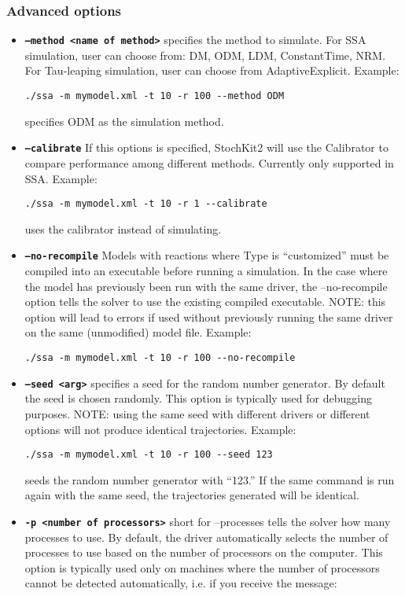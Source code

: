 \documentclass[11pt,letterpaper]{article}
\begin{document}
\subsubsection{Advanced options}
\begin{itemize}
    \item \texttt{\textbf{--method <name of method>}} specifies the method to simulate. For SSA simulation, user can choose from: DM, ODM, LDM, ConstantTime, NRM. For Tau-leaping simulation, user can choose from AdaptiveExplicit.
Example: 
\begin{lstlisting}
./ssa -m mymodel.xml -t 10 -r 100 --method ODM
\end{lstlisting}
specifies ODM as the simulation method.
\item \texttt{\textbf{--calibrate}} If this options is specified, StochKit2 will use the Calibrator to compare performance among different methods. Currently only supported in SSA.
Example: 
\begin{lstlisting}
./ssa -m mymodel.xml -t 10 -r 1 --calibrate
\end{lstlisting}
uses the calibrator instead of simulating.
\item \texttt{\textbf{--no-recompile}} Models with reactions where Type is ``customized'' must be compiled into an executable before running a simulation.  In the case where the model has previously been run with the same driver, the --no-recompile option tells the solver to use the existing compiled executable.  NOTE: this option will lead to errors if used without previously running the same driver on the same (unmodified) model file.
Example: 
\begin{lstlisting}
./ssa -m mymodel.xml -t 10 -r 100 --no-recompile
\end{lstlisting}
\item \texttt{\textbf{--seed <arg>}} specifies a seed for the random number generator.  By default the seed is chosen randomly.  This option is typically used for debugging purposes.  NOTE: using the same seed with different drivers or different options will not produce identical trajectories.
Example: 
\begin{lstlisting}
./ssa -m mymodel.xml -t 10 -r 100 --seed 123
\end{lstlisting}
seeds the random number generator with ``123.''  If the same command is run again with the same seed, the trajectories generated will be identical.
\item \texttt{\textbf{-p <number of processors>}} short for --processes tells the solver how many processes to use.  By default, the driver automatically selects the number of processes to use based on the number of processors on the computer.  This option is typically used only on machines where the number of processors cannot be detected automatically, i.e. if you receive the message: 

\end{itemize}
\end{document}
